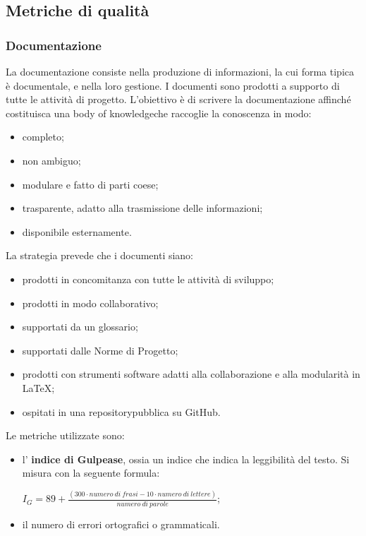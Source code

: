 {	

\subsection{Metriche di qualità}
\subsubsection{Documentazione}
La documentazione consiste nella produzione di informazioni, la cui forma tipica è documentale, e nella loro gestione. I documenti sono prodotti a supporto di tutte le attività di progetto.
L'obiettivo è di scrivere la documentazione affinché costituisca una body of knowledge\glosp che raccoglie la conoscenza in modo:
\begin{itemize}
	\item completo;
	\item non ambiguo;
	\item modulare e fatto di parti coese;
	\item trasparente, adatto alla trasmissione delle informazioni;
	\item disponibile esternamente.
\end{itemize}
La strategia prevede che i documenti siano: 
\begin{itemize}
	\item prodotti in concomitanza con tutte le attività di sviluppo;
	\item prodotti in modo collaborativo;
	\item supportati da un glossario;
	\item supportati dalle Norme di Progetto;
	\item prodotti con strumenti software adatti alla collaborazione e alla modularità in \LaTeX;
	\item ospitati in una repository\glosp pubblica su GitHub.
\end{itemize}
Le metriche utilizzate sono:
\begin{itemize}
	\item l'\textbf{ indice di Gulpease}, ossia un indice che indica la leggibilità del testo. Si misura con la seguente formula:
	\begin{center}
		$I_G = 89+ \frac{(300 \cdot numero\ di\ frasi - 10 \cdot numero\ di\ lettere)}{numero\ di\ parole}$;
	\end{center}
	\item il numero di errori ortografici o grammaticali.
\end{itemize}
}
